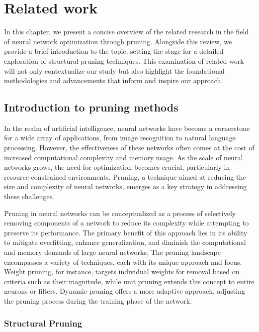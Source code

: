 \chapter{Related work}

In this chapter, we present a concise overview of the related research in the field of neural network optimization through pruning. Alongside this review, we provide a brief introduction to the topic, setting the stage for a detailed exploration of structural pruning techniques. This examination of related work will not only contextualize our study but also highlight the foundational methodologies and advancements that inform and inspire our approach.

\section{Introduction to pruning methods}

In the realm of artificial intelligence, neural networks have become a cornerstone for a wide array of applications, from image recognition to natural language processing. However, the effectiveness of these networks often comes at the cost of increased computational complexity and memory usage. As the scale of neural networks grows, the need for optimization becomes crucial, particularly in resource-constrained environments. Pruning, a technique aimed at reducing the size and complexity of neural networks, emerges as a key strategy in addressing these challenges.

Pruning in neural networks can be conceptualized as a process of selectively removing components of a network to reduce its complexity while attempting to preserve its performance. The primary benefit of this approach lies in its ability to mitigate overfitting, enhance generalization, and diminish the computational and memory demands of large neural networks. The pruning landscape encompasses a variety of techniques, each with its unique approach and focus. Weight pruning, for instance, targets individual weights for removal based on criteria such as their magnitude, while unit pruning extends this concept to entire neurons or filters. Dynamic pruning offers a more adaptive approach, adjusting the pruning process during the training phase of the network.

\subsection{Structural Pruning}

